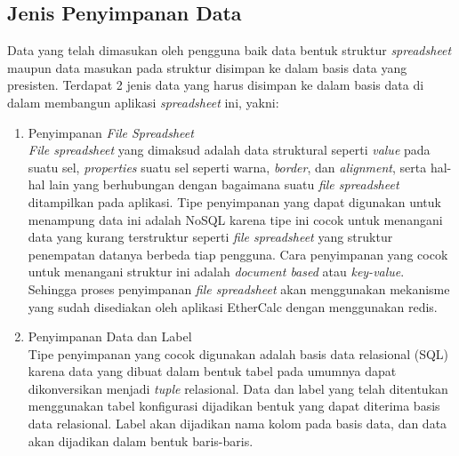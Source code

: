 	\subsection{Jenis Penyimpanan Data} \label{JenisPenyimpanan}
	Data yang telah dimasukan oleh pengguna baik data bentuk struktur \textit{spreadsheet} maupun data masukan pada struktur disimpan ke dalam basis data yang presisten. Terdapat 2 jenis data yang harus disimpan ke dalam basis data di dalam membangun aplikasi \textit{spreadsheet} ini, yakni:

	\begin{enumerate}
		\item Penyimpanan \textit{File Spreadsheet} \\
		\textit{File spreadsheet} yang dimaksud adalah data struktural seperti \textit{value} pada suatu sel, \textit{properties} suatu sel seperti warna, \textit{border}, dan \textit{alignment}, serta hal-hal lain yang berhubungan dengan bagaimana suatu \textit{file spreadsheet} ditampilkan pada aplikasi. Tipe penyimpanan yang dapat digunakan untuk menampung data ini adalah NoSQL karena tipe ini cocok untuk menangani data yang kurang terstruktur seperti \textit{file spreadsheet} yang struktur penempatan datanya berbeda tiap pengguna. Cara penyimpanan yang cocok untuk menangani struktur ini adalah \textit{document based} atau \textit{key-value}. Sehingga proses penyimpanan \textit{file spreadsheet} akan menggunakan mekanisme yang sudah disediakan oleh aplikasi EtherCalc dengan menggunakan redis.

		\item Penyimpanan Data dan Label \\
		Tipe penyimpanan yang cocok digunakan adalah basis data relasional (SQL) karena data yang dibuat dalam bentuk tabel pada umumnya dapat dikonversikan menjadi \textit{tuple} relasional. Data dan label yang telah ditentukan menggunakan tabel konfigurasi dijadikan bentuk yang dapat diterima basis data relasional. Label akan dijadikan nama kolom pada basis data, dan data akan dijadikan dalam bentuk baris-baris.



	\end{enumerate}

